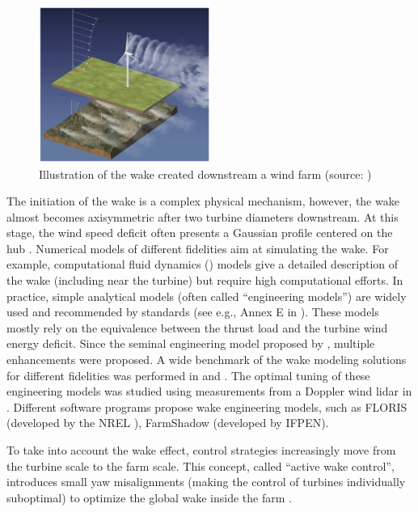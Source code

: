 \begin{figure}%
    \centering
    \includegraphics[width=0.5\textwidth]{./part1/figures/wake.png}
    \caption{Illustration of the wake created downstream a wind farm (source: \citealp{veers_2019_review})} 
    \label{fig:wake_illustration}
\end{figure}

The initiation of the wake is a complex physical mechanism, however, the wake almost becomes axisymmetric after two turbine diameters downstream. 
At this stage, the wind speed deficit often presents a Gaussian profile centered on the hub \citep{burton_2021_wind_handbook}. 
Numerical models of different fidelities aim at simulating the wake. 
For example, computational fluid dynamics () models give a detailed description of the wake (including near the turbine) but require high computational efforts. 
In practice, simple analytical models (often called ``engineering models'') are widely used and recommended by standards (see e.g., Annex E in \citealp{iec_2019}). 
These models mostly rely on the equivalence between the thrust load and the turbine wind energy deficit. 
Since the seminal engineering model proposed by \citet{jensen_1983_wake}, multiple enhancements were proposed. 
A wide benchmark of the wake modeling solutions for different fidelities was performed in \citet{doubrawa_2020_benchmark} and \citet{hiperwind_2023_wp3}. 
The optimal tuning of these engineering models was studied using measurements from a Doppler wind lidar in \citet{zhan_2020_optimal_wake}. 
Different software programs propose wake engineering models, such as FLORIS (developed by the NREL \citet{fleming_2020_FLORIS}), FarmShadow (developed by IFPEN). 

To take into account the wake effect, control strategies increasingly move from the turbine scale to the farm scale. 
This concept, called ``active wake control'', introduces small yaw misalignments (making the control of turbines individually suboptimal) to optimize the global wake inside the farm \citep{rott_2018_active_control,simley_2020_active_control,meyers_2022_active_control}. 


